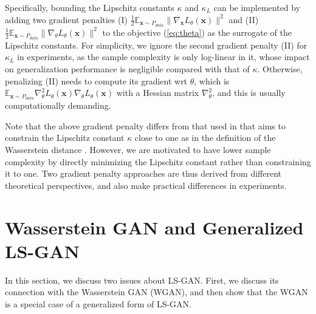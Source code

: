 
Specifically, bounding the Lipschitz constants $\kappa$ and $\kappa_L$ can be implemented by adding two gradient penalties (I) $\frac{1}{2}\mathbb E_{\mathbf x\sim P_{data}} \|\nabla_\mathbf x L_\theta(\mathbf x)\|^2$ and (II) $\frac{1}{2}\mathbb E_{\mathbf x\sim P_{data}} \|\nabla_{\theta} L_\theta(\mathbf x)\|^2$
to the objective (\ref{eq:theta}) as the surrogate of the Lipschitz constants. For simplicity, we  ignore the second gradient penalty (II) for $\kappa_L$ in experiments, as the sample complexity is only log-linear in it, whose impact on generalization performance is negligible compared with that of $\kappa$. Otherwise, penalizing (II) needs to compute its gradient wrt $\theta$, which is $\mathbb E_{\mathbf x\sim P_{data}} \nabla^2_{\theta} L_\theta(\mathbf x) \nabla_{\theta} L_\theta(\mathbf x)$ with a Hessian matrix $\nabla^2_{\theta}$, and this is usually computationally demanding.

Note that the above gradient penalty differs from that used in \cite{gulrajani2017improved} that aims to constrain the Lipschitz constant $\kappa$ close to one as in the definition of the Wasserstein distance \cite{wgan17}. However, we are motivated to have lower sample complexity by directly minimizing the Lipschitz constant rather than constraining it to one.  Two gradient penalty approaches are thus derived from different theoretical perspectives, and also make practical differences in experiments.



\section{Wasserstein GAN and Generalized LS-GAN}
In this section, we discuss two issues about LS-GAN.  First, we discuss its connection with the Wasserstein GAN (WGAN), and then show that the WGAN is a special case of a generalized form of LS-GAN.

